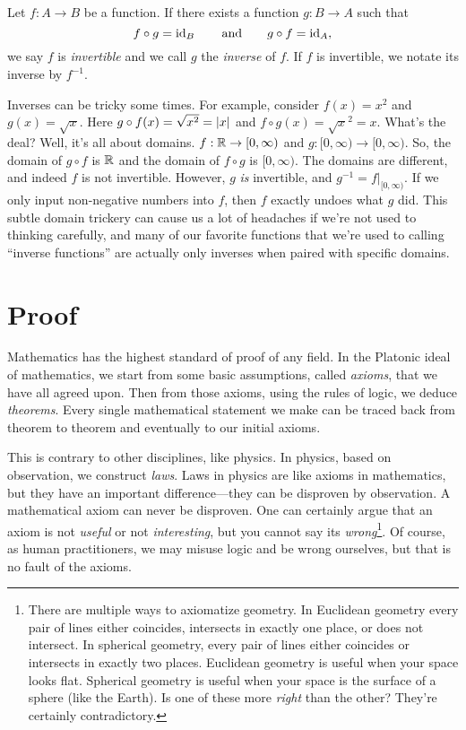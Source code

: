 	\begin{definition}
		Let $f:A\to B$ be a function.  If there exists a function $g:B\to A$ such that
		\[
			f\circ g=\operatorname{id}_B\qquad\text{and}\qquad g\circ f=\operatorname{id}_A,
		\]
		we say $f$ is \emph{invertible} and we call $g$ the \emph{inverse} of $f$.
		If $f$ is invertible, we notate its inverse by $f^{-1}$.
	\end{definition}

	Inverses can be tricky some times.  For example, consider $f(x)=x^2$ and $g(x)=\sqrt{x}$.
	Here $g\circ f(x)=\sqrt{x^2}=\lvert x\rvert$ and $f\circ g(x) = \sqrt{x}^2=x$.  What's the deal?
	Well, it's all about domains.  $f:\mathbb{R}\to[0,\infty)$ and $g:[0,\infty)\to[0,\infty)$.
	So, the domain of $g\circ f$ is $\mathbb{R}$ and the domain of $f\circ g$ is $[0,\infty)$.  The
	domains are different, and indeed $f$ is not invertible.  However, $g$ \emph{is} invertible,
	and $g^{-1}=f\big|_{[0,\infty)}$.  If we only input non-negative numbers into $f$, then
	$f$ exactly undoes what $g$ did.  This subtle domain trickery can cause us a lot
	of headaches if we're not used to thinking carefully, and many of our favorite functions
	that we're used to calling ``inverse functions'' are actually only inverses when paired with
	specific domains.

\section{Proof}
	Mathematics has the highest standard of proof of any field.  In the Platonic ideal
	of mathematics, we start from some basic assumptions, called \emph{axioms}, that we have
	all agreed upon.  Then from those axioms, using the rules of logic, we deduce \emph{theorems}.
	Every single mathematical statement we make can be traced back from theorem to theorem
	and eventually to our initial axioms.

	This is contrary to other disciplines, like physics.
	In physics, based on observation, we construct
	\emph{laws}.  Laws in physics are like
	axioms in mathematics, but they have an important difference---they
	can be disproven by observation.  A mathematical axiom can never be disproven.  One can
	certainly argue that an axiom is not \emph{useful} or not \emph{interesting}, but you
	cannot say its \emph{wrong}\footnote{
		There are multiple ways to axiomatize geometry.  In
		Euclidean geometry every pair of lines either coincides, intersects in
		exactly one place, or does not intersect.  In spherical
		geometry, every pair of lines either coincides or intersects in exactly two places.  
		Euclidean geometry is useful when your space looks flat.  Spherical
		geometry is useful when your space is the surface of a sphere (like 
		the Earth).
		Is one of these more \emph{right} than the other?  They're certainly
		contradictory.
	}.
	Of course, as human practitioners, we may misuse logic and be wrong ourselves, but that
	is no fault of the axioms.

